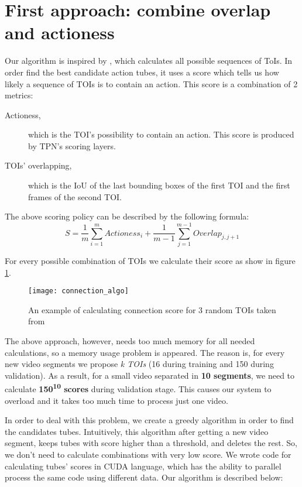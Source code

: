 \section{First approach: combine overlap and actioness}
Our algorithm is inspired by \cite{DBLP:journals/corr/HouCS17}, which calculates all possible sequences of ToIs. In order find the best candidate action tubes,
it uses a score which tells us how likely a sequence of TOIs is  to contain an action. This score is a combination of 2 metrics:
\begin{description}
\item[ Actioness,  ] which is the TOI's possibility to contain an action. This score is produced by TPN's scoring layers.
\item [ TOIs' overlapping, ] which is the IoU of the last bounding boxes of the first TOI and the first frames of the second TOI.
\end{description}

The above scoring policy can be described by the following formula:
\[ S = \frac{1}{m} \sum_ {i=1}^{m} Actioness_i + \frac{1}{m-1} \sum_{j=1}^{m-1} Overlap_{j,j+1} \]

For every possible combination of TOIs we calculate their score as show in figure \ref{fig:connection_algo}.

\begin{figure}[h]
  \centering
  \texttt{[image: connection\_algo]}
  \caption{An example of calculating connection score for 3 random TOIs taken from \cite{DBLP:journals/corr/HouCS17}}
  \label{fig:connection_algo}
\end{figure}

The above approach, however, needs too much memory for all needed calculations, so a memory usage  problem is
appeared. The reason is, for every new video segments we propose \textit{k TOIs} (16 during training and 150 during validation).
As a result, for a small video separated in  \textbf{10 segments}, we need to calculate 
\textbf{  150\textsuperscript{10} scores} during validation stage. This causes our system to overload and it takes too much time to process
just one video. \par

In order to deal with this problem, we create a greedy algorithm in order to find the candidates tubes. Intuitively, this algorithm after
getting  a new video segment, keeps tubes with score higher than a threshold, and deletes the rest. So, we don't need to calculate combinations with
very low score. We wrote code for calculating tubes' scores in CUDA language, which has the ability to
parallel process the same code using different data. Our algorithm is described below:

